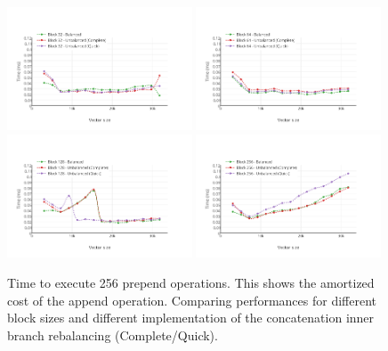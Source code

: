 \begin{figure}[h!]
  \centering
  \includegraphics[width=0.49\textwidth]{Benchmarks/Prepend_blocks_32.pdf}
  \includegraphics[width=0.49\textwidth]{Benchmarks/Prepend_blocks_64.pdf}
  \includegraphics[width=0.49\textwidth]{Benchmarks/Prepend_blocks_128.pdf}
  \includegraphics[width=0.49\textwidth]{Benchmarks/Prepend_blocks_256.pdf}
  \label{PrependBenchmarks}
  \caption{Time to execute 256 prepend operations. This shows the amortized cost of the append operation. Comparing performances for different block sizes and different implementation of the concatenation inner branch rebalancing (Complete/Quick).}
\end{figure}


